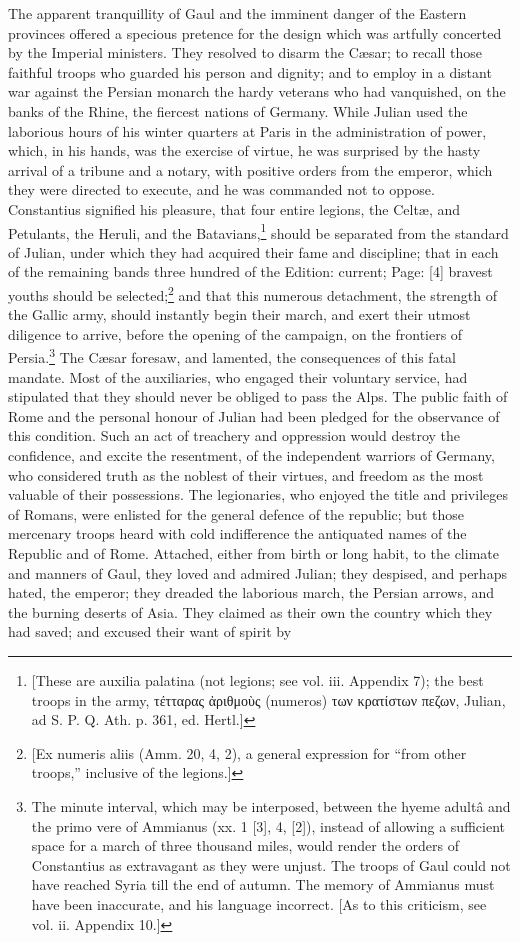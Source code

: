 The apparent tranquillity of Gaul and the imminent danger of the Eastern provinces offered a specious pretence for the design which was artfully concerted by the Imperial ministers. They resolved to disarm the Cæsar; to recall those faithful troops who guarded his person and dignity; and to employ in a distant war against the Persian monarch the hardy veterans who had vanquished, on the banks of the Rhine, the fiercest nations of Germany. While Julian used the laborious hours of his winter quarters at Paris in the administration of power, which, in his hands, was the exercise of virtue, he was surprised by the hasty arrival of a tribune and a notary, with positive orders from the emperor, which they were directed to execute, and he was commanded not to oppose. Constantius signified his pleasure, that four entire legions, the Celtæ, and Petulants, the Heruli, and the Batavians,\footnote{[These are auxilia palatina (not legions; see vol. iii. Appendix 7); the best troops in the army, \textgreek{τέτταρας \texthebrew{ἀ}ριθμο\texthebrew{ὺ}ς} (numeros) \textgreek{των κρατίστων πεζων}, Julian, ad S. P. Q. Ath. p. 361, ed. Hertl.]} should be separated from the standard of Julian, under which they had acquired their fame and discipline; that in each of the remaining bands three hundred of the Edition: current; Page: [4] bravest youths should be selected;\footnote{[Ex numeris aliis (Amm. 20, 4, 2), a general expression for \texthebrew{“}from other troops,\texthebrew{}” inclusive of the legions.]} and that this numerous detachment, the strength of the Gallic army, should instantly begin their march, and exert their utmost diligence to arrive, before the opening of the campaign, on the frontiers of Persia.\footnote{The minute interval, which may be interposed, between the hyeme adultâ and the primo vere of Ammianus (xx. 1 [3], 4, [2]), instead of allowing a sufficient space for a march of three thousand miles, would render the orders of Constantius as extravagant as they were unjust. The troops of Gaul could not have reached Syria till the end of autumn. The memory of Ammianus must have been inaccurate, and his language incorrect. [As to this criticism, see vol. ii. Appendix 10.]} The Cæsar foresaw, and lamented, the consequences of this fatal mandate. Most of the auxiliaries, who engaged their voluntary service, had stipulated that they should never be obliged to pass the Alps. The public faith of Rome and the personal honour of Julian had been pledged for the observance of this condition. Such an act of treachery and oppression would destroy the confidence, and excite the resentment, of the independent warriors of Germany, who considered truth as the noblest of their virtues, and freedom as the most valuable of their possessions. The legionaries, who enjoyed the title and privileges of Romans, were enlisted for the general defence of the republic; but those mercenary troops heard with cold indifference the antiquated names of the Republic and of Rome. Attached, either from birth or long habit, to the climate and manners of Gaul, they loved and admired Julian; they despised, and perhaps hated, the emperor; they dreaded the laborious march, the Persian arrows, and the burning deserts of Asia. They claimed as their own the country which they had saved; and excused their want of spirit by 